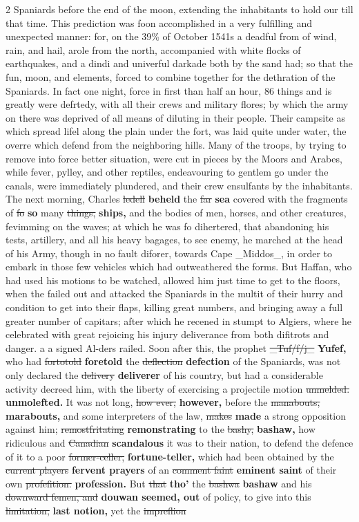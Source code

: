 \documentclass[10pt]{article}
\begin{document}
\begin{multicols}{2}
Spaniards before the end of the moon, extending the inhabitants to hold our till that time. This prediction was foon accomplished in a very fulfilling and unexpected manner: for, on the 39\% of October 1541s a deadful from of wind, rain, and hail, arole from the north, accompanied with white flocks of earthquakes, and a dindi and univerful darkade both by the sand had; so that the fun, moon, and elements, forced to combine together for the dethration of the Spaniards. In fact one night, force in first than half an hour, 86 things and is greatly were defrtedy, with all their crews and military flores; by which the army on there was deprived of all means of diluting in their people. Their campsite as which spread lifel along the plain under the fort, was laid quite under water, the overre which defend from the neighboring hills. Many of the troops, by trying to remove into force better situation, were cut in pieces by the Moors and Arabes, while fever, pylley, and other reptiles, endeavouring to gentlem go under the canals, were immediately plundered, and their crew ensulfants by the inhabitants. The next morning, Charles \sout{ledell} \textbf{beheld} the \sout{far} \textbf{sea} covered with the fragments of \sout{fo} \textbf{so} many \sout{things,} \textbf{ships,} and the bodies of men, horses, and other creatures, fevimming on the waves; at which he was fo dihertered, that abandoning his tests, artillery, and all his heavy bagages, to see enemy, he marched at the head of his Army, though in no fault diforer, towards Cape \_Middos\_, in order to embark in those few vehicles which had outweathered the forms. But Haffan, who had used his motions to be watched, allowed him just time to get to the floors, when the failed out and attacked the Spaniards in the multit of their hurry and condition to get into their flaps, killing great numbers, and bringing away a full greater number of capitars; after which he recened in stumpt to Algiers, where he celebrated with great rejoicing his injury deliverance from both difitrots and danger. a a signed Al-ders railed. Soon after this, the prophet \sout{\_Tuf/f/j\_} \textbf{Yufef,} who had \sout{fortotold} \textbf{foretold} the \sout{deflection} \textbf{defection} of the Spaniards, was not only declared the \sout{delivery} \textbf{deliverer} of his country, but had a considerable activity decreed him, with the liberty of exercising a projectile motion \sout{unmelded.} \textbf{unmolefted.} It was not long, \sout{how ever,} \textbf{however,} before the \sout{manabouts,} \textbf{marabouts,} and some interpreters of the law, \sout{makes} \textbf{made} a strong opposition against him; \sout{remostfritating} \textbf{remonstrating} to the \sout{bashy,} \textbf{bashaw,} how ridiculous and \sout{Canadian} \textbf{scandalous} it was to their nation, to defend the defence of it to a poor \sout{former-celler,} \textbf{fortune-teller,} which had been obtained by the \sout{current players} \textbf{fervent prayers} of an \sout{comment faint} \textbf{eminent saint} of their own \sout{profefition.} \textbf{profession.} But \sout{that} \textbf{tho'} the \sout{bashwa} \textbf{bashaw} and his \sout{downward femen, and} \textbf{douwan seemed, out} of policy, to give into this \sout{limitation,} \textbf{last notion,} yet the \sout{impreflion} 
\end{multicols}
\end{document}
